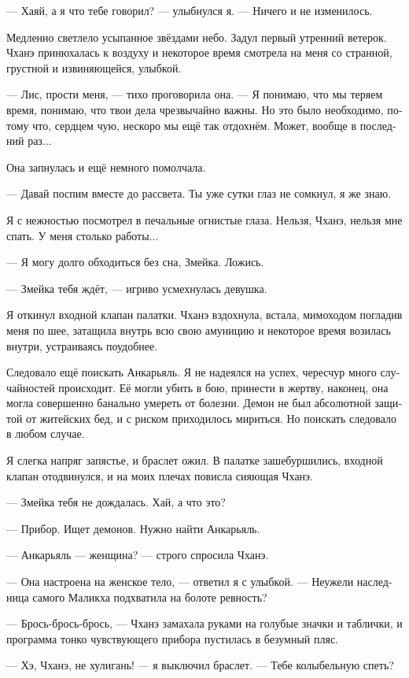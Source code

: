 \documentclass[a4paper,12pt,fleqn]{book}\usepackage{polyglossia}\setdefaultlanguage[babelshorthands=true]{russian}\setotherlanguage{english}\defaultfontfeatures{Ligatures=TeX,Mapping=tex-text}\usepackage{xcolor}\newcommand{\ml}[3]{#2}
\begin{document}
{--- Хаяй, а я что тебе говорил? --- улыбнулся я.
--- Ничего и не изменилось.

Медленно светлело усыпанное звёздами небо.
Задул первый утренний ветерок.
Чханэ принюхалась к воздуху и некоторое время смотрела на меня со странной, грустной и извиняющейся, улыбкой.

--- Лис, прости меня, --- тихо проговорила она.
--- Я понимаю, что мы теряем время, понимаю, что твои дела чрезвычайно важны.
Но это было необходимо, потому что, сердцем чую, нескоро мы ещё так отдохнём.
Может, вообще в последний раз...

Она запнулась и ещё немного помолчала.

--- Давай поспим вместе до рассвета.
Ты уже сутки глаз не сомкнул, я же знаю.

Я с нежностью посмотрел в печальные огнистые глаза.
Нельзя, Чханэ, нельзя мне спать.
У меня столько работы...

--- Я могу долго обходиться без сна, Змейка.
Ложись.

--- Змейка тебя ждёт, --- игриво усмехнулась девушка.

Я откинул входной клапан палатки.
Чханэ вздохнула, встала, мимоходом погладив меня по шее, затащила внутрь всю свою амуницию и некоторое время возилась внутри, устраиваясь поудобнее.

Следовало ещё поискать Анкарьяль.
Я не надеялся на успех, чересчур много случайностей происходит.
Её могли убить в бою, принести в жертву, наконец, она могла совершенно банально умереть от болезни.
Демон не был абсолютной защитой от житейских бед, и с риском приходилось мириться.
Но поискать следовало в любом случае.

Я слегка напряг запястье, и браслет ожил.
В палатке зашебуршились, входной клапан отодвинулся, и на моих плечах повисла сияющая Чханэ.

--- Змейка тебя не дождалась.
Хай, а что это?

--- Прибор.
Ищет демонов.
Нужно найти Анкарьяль.

--- Анкарьяль --- женщина? --- строго спросила Чханэ.

--- Она настроена на женское тело, --- ответил я с улыбкой.
--- Неужели наследница самого Маликха подхватила на болоте ревность?

--- Брось-брось-брось, --- Чханэ замахала руками на голубые значки и таблички, и программа тонко чувствующего прибора пустилась в безумный пляс.

--- Хэ, Чханэ, не хулигань! --- я выключил браслет.
--- Тебе колыбельную спеть?

}
\end{document}
